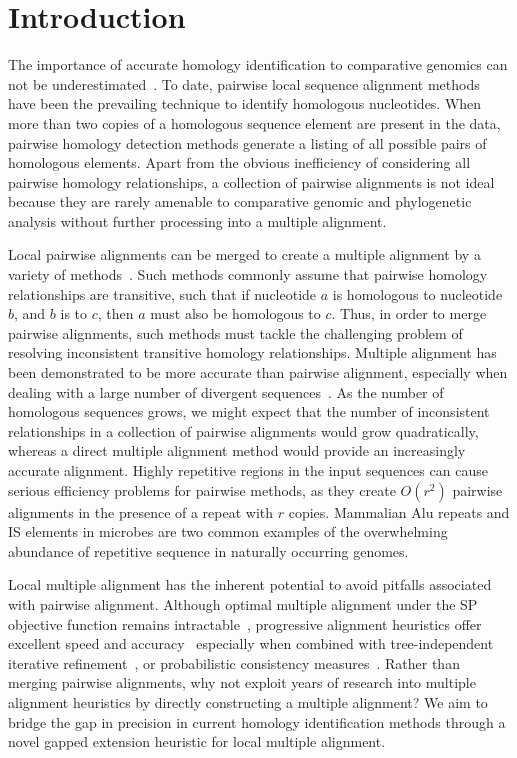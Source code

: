 \documentclass{ws-procs9x6}
\begin{document}
\bodymatter

\section{Introduction}

The importance of accurate homology identification to comparative genomics can not be underestimated~\cite{Kumar07}. To date, pairwise local sequence alignment methods~\cite{ref-blastz, ref-ssearch} have been the prevailing technique to identify homologous nucleotides.  When more than two copies of a homologous sequence element are present in the data, pairwise homology detection methods generate a listing of all possible pairs of homologous elements.  Apart from the obvious inefficiency of considering all pairwise homology relationships, a collection of pairwise alignments is not ideal because they are rarely amenable to comparative genomic and phylogenetic analysis without further processing into a multiple alignment.

Local pairwise alignments can be merged to create a multiple alignment by a variety of methods~\cite{ref-tba,ref-aba,ref-dialign,ref-related1}. Such methods commonly assume that pairwise homology relationships are transitive, such that if nucleotide $a$ is homologous to nucleotide $b$, and $b$ is to $c$, then $a$ must also be homologous to $c$.  Thus, in order to merge pairwise alignments, such methods must tackle the challenging problem of resolving inconsistent transitive homology relationships.  Multiple alignment has been demonstrated to be more accurate than pairwise alignment, especially when dealing with a large number of divergent sequences~\cite{ref-mlagan,ref-aubergene}.  As the number of homologous sequences grows, we might expect that the number of inconsistent relationships in a collection of pairwise alignments would grow quadratically, whereas a direct multiple alignment method would provide an increasingly accurate alignment.  Highly repetitive regions in the input sequences can cause serious efficiency problems for pairwise methods, as they create $O(r^{2})$ pairwise alignments in the presence of a repeat with $r$ copies.  Mammalian Alu repeats and IS elements in microbes are two common examples of the overwhelming abundance of repetitive sequence in naturally occurring genomes.

Local multiple alignment has the inherent potential to avoid pitfalls associated with pairwise alignment. Although optimal multiple alignment under the SP objective function remains intractable~\cite{ref-wangjiang}, progressive alignment heuristics offer excellent speed and accuracy~\cite{ref-clustalw, ref-tcoffee} especially when combined with tree-independent iterative refinement~\cite{ref-muscle}, or probabilistic consistency measures~\cite{ref-probcons}. Rather than merging pairwise alignments, why not exploit years of research into multiple alignment heuristics by directly constructing a multiple alignment? We aim to bridge the gap in precision in current homology identification methods through a novel gapped extension heuristic for local multiple alignment.
\end{document}
